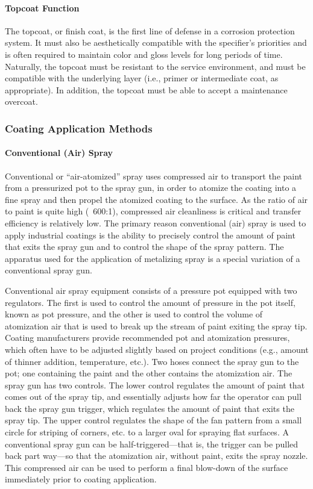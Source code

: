 \paragraph{Topcoat Function}
The topcoat, or finish coat, is the first line of defense in a corrosion protection system. It must also be
aesthetically compatible with the specifier’s priorities and is often required to maintain color and gloss levels for long
periods of time. Naturally, the topcoat must be resistant to the service environment, and must be compatible with the
underlying layer (i.e., primer or intermediate coat, as appropriate). In addition, the topcoat must be able to accept a
maintenance overcoat.

\subsubsection{Coating Application Methods}

\paragraph{Conventional (Air) Spray}
Conventional or “air-atomized” spray uses compressed air to transport the paint from a pressurized pot to the
spray gun, in order to atomize the coating into a fine spray and then propel the atomized coating to the surface. As
the ratio of air to paint is quite high (~600:1), compressed air cleanliness is critical and transfer efficiency is
relatively low. The primary reason conventional (air) spray is used to apply industrial coatings is the ability to
precisely control the amount of paint that exits the spray gun and to control the shape of the spray pattern. The
apparatus used for the application of metalizing spray is a special variation of a conventional spray gun.

Conventional air spray equipment consists of a pressure pot equipped with two regulators. The first is used to
control the amount of pressure in the pot itself, known as pot pressure, and the other is used to control the volume of
atomization air that is used to break up the stream of paint exiting the spray tip. Coating manufacturers provide
recommended pot and atomization pressures, which often have to be adjusted slightly based on project conditions
(e.g., amount of thinner addition, temperature, etc.). Two hoses connect the spray gun to the pot; one containing the
paint and the other contains the atomization air. The spray gun has two controls. The lower control regulates the
amount of paint that comes out of the spray tip, and essentially adjusts how far the operator can pull back the spray
gun trigger, which regulates the amount of paint that exits the spray tip. The upper control regulates the shape of the
fan pattern from a small circle for striping of corners, etc. to a larger oval for spraying flat surfaces. A conventional
spray gun can be half-triggered—that is, the trigger can be pulled back part way—so that the atomization air, without paint, exits the spray nozzle. This compressed air can be used to perform a final blow-down of the surface
immediately prior to coating application.

